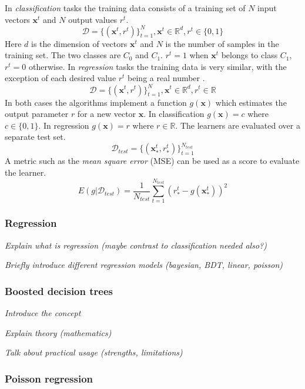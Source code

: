 \documentclass[english,12pt,a4paper,pdftex,sci,utf8]{aaltothesis}
\theoremstyle{definition}
\newcommand{\nyi}[1]{\noindent\colorbox{nyibg}{\textcolor{nyitext}{\emph{#1}}}}
\begin{document}
In \emph{classification} tasks the training data consists of a training set of $N$ input vectors $\mathbf{x}^t$ and $N$ output values $r^t$.
$$\mathcal{D} = \{(\mathbf{x}^t, r^t)\}_{t=1}^N, \mathbf{x}^t \in \mathbb{R}^d, r^t \in \{0, 1\} $$
Here $d$ is the dimension of vectors $\mathbf{x}^t$ and $N$ is the number of samples in the training set.
The two classes are $C_0$ and $C_1$. $r^t = 1$ when $\mathbf{x}^t$ belongs to class $C_1$, $r^t = 0$ otherwise. \cite{alpaydin}
In \emph{regression} tasks the training data is very similar, with the exception of each desired value $r^t$ being a real number \cite{alpaydin}.
$$\mathcal{D} = \{(\mathbf{x}^t, r^t)\}_{t=1}^N, \mathbf{x}^t \in \mathbb{R}^d, r^t \in \mathbb{R}$$
In both cases the algorithms implement a function $g(\mathbf{x})$ which estimates the output parameter $r$ for a new vector $\mathbf{x}$. 
In classification $g(\mathbf{x}) = c$ where $c \in \{0, 1\}$. 
In regression $g(\mathbf{x}) = r$ where $r \in \mathbb{R}$.
The learners are evaluated over a separate test set.
$$\mathcal{D}_{test} = \{ (\mathbf{x}_*^t , r_*^t) \}_{t=1}^{N_{test}}$$
A metric such as the \emph{mean square error} (MSE) can be used as a score to evaluate the learner. \cite{alpaydin}
$$E(g | \mathcal{D}_{test}) = \frac{1}{N_{test}} \sum_{t=1}^{N_{test}} (r_*^t - g(\mathbf{x}_*^t))^2$$

\subsubsection{Regression}

\nyi{Explain what is regression (maybe contrast to classification needed also?)}

\nyi{Briefly introduce different regression models (bayesian, BDT, linear, poisson)}

\subsubsection{Boosted decision trees}

\nyi{Introduce the concept}

\nyi{Explain theory (mathematics)}

\nyi{Talk about practical usage (strengths, limitations)}

\subsubsection{Poisson regression}
\end{document}
